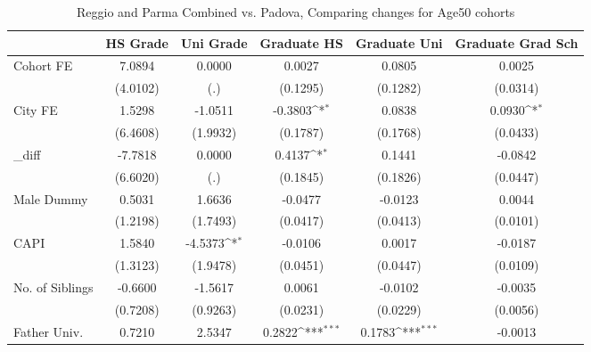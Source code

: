\begin{table}[htbp]\centering
\def\sym#1{\ifmmode^{#1}\else\(^{#1}\)\fi}
\caption{Reggio and Parma Combined vs. Padova, Comparing changes for Age50 cohorts}
\begin{tabular}{l*{5}{c}}
\toprule
            &\multicolumn{1}{c}{HS Grade}&\multicolumn{1}{c}{Uni Grade}&\multicolumn{1}{c}{Graduate HS}&\multicolumn{1}{c}{Graduate Uni}&\multicolumn{1}{c}{Graduate Grad Sch}\\
\midrule
Cohort FE   &      7.0894         &      0.0000         &      0.0027         &      0.0805         &      0.0025         \\
            &    (4.0102)         &         (.)         &    (0.1295)         &    (0.1282)         &    (0.0314)         \\
\addlinespace
City FE     &      1.5298         &     -1.0511         &     -0.3803\sym{*}  &      0.0838         &      0.0930\sym{*}  \\
            &    (6.4608)         &    (1.9932)         &    (0.1787)         &    (0.1768)         &    (0.0433)         \\
\addlinespace
\_diff       &     -7.7818         &      0.0000         &      0.4137\sym{*}  &      0.1441         &     -0.0842         \\
            &    (6.6020)         &         (.)         &    (0.1845)         &    (0.1826)         &    (0.0447)         \\
\addlinespace
Male Dummy  &      0.5031         &      1.6636         &     -0.0477         &     -0.0123         &      0.0044         \\
            &    (1.2198)         &    (1.7493)         &    (0.0417)         &    (0.0413)         &    (0.0101)         \\
\addlinespace
CAPI        &      1.5840         &     -4.5373\sym{*}  &     -0.0106         &      0.0017         &     -0.0187         \\
            &    (1.3123)         &    (1.9478)         &    (0.0451)         &    (0.0447)         &    (0.0109)         \\
\addlinespace
No. of Siblings&     -0.6600         &     -1.5617         &      0.0061         &     -0.0102         &     -0.0035         \\
            &    (0.7208)         &    (0.9263)         &    (0.0231)         &    (0.0229)         &    (0.0056)         \\
\addlinespace
Father Univ.&      0.7210         &      2.5347         &      0.2822\sym{***}&      0.1783\sym{***}&     -0.0013         \\

\end{tabular}
\end{table}
